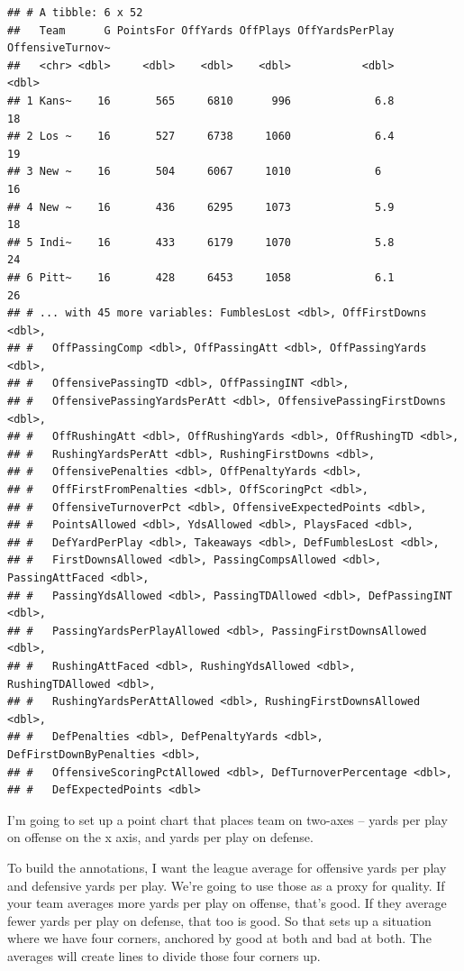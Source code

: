 \documentclass[]{book}
\begin{document}
\begin{verbatim}
## # A tibble: 6 x 52
##   Team      G PointsFor OffYards OffPlays OffYardsPerPlay OffensiveTurnov~
##   <chr> <dbl>     <dbl>    <dbl>    <dbl>           <dbl>            <dbl>
## 1 Kans~    16       565     6810      996             6.8               18
## 2 Los ~    16       527     6738     1060             6.4               19
## 3 New ~    16       504     6067     1010             6                 16
## 4 New ~    16       436     6295     1073             5.9               18
## 5 Indi~    16       433     6179     1070             5.8               24
## 6 Pitt~    16       428     6453     1058             6.1               26
## # ... with 45 more variables: FumblesLost <dbl>, OffFirstDowns <dbl>,
## #   OffPassingComp <dbl>, OffPassingAtt <dbl>, OffPassingYards <dbl>,
## #   OffensivePassingTD <dbl>, OffPassingINT <dbl>,
## #   OffensivePassingYardsPerAtt <dbl>, OffensivePassingFirstDowns <dbl>,
## #   OffRushingAtt <dbl>, OffRushingYards <dbl>, OffRushingTD <dbl>,
## #   RushingYardsPerAtt <dbl>, RushingFirstDowns <dbl>,
## #   OffensivePenalties <dbl>, OffPenaltyYards <dbl>,
## #   OffFirstFromPenalties <dbl>, OffScoringPct <dbl>,
## #   OffensiveTurnoverPct <dbl>, OffensiveExpectedPoints <dbl>,
## #   PointsAllowed <dbl>, YdsAllowed <dbl>, PlaysFaced <dbl>,
## #   DefYardPerPlay <dbl>, Takeaways <dbl>, DefFumblesLost <dbl>,
## #   FirstDownsAllowed <dbl>, PassingCompsAllowed <dbl>, PassingAttFaced <dbl>,
## #   PassingYdsAllowed <dbl>, PassingTDAllowed <dbl>, DefPassingINT <dbl>,
## #   PassingYardsPerPlayAllowed <dbl>, PassingFirstDownsAllowed <dbl>,
## #   RushingAttFaced <dbl>, RushingYdsAllowed <dbl>, RushingTDAllowed <dbl>,
## #   RushingYardsPerAttAllowed <dbl>, RushingFirstDownsAllowed <dbl>,
## #   DefPenalties <dbl>, DefPenaltyYards <dbl>, DefFirstDownByPenalties <dbl>,
## #   OffensiveScoringPctAllowed <dbl>, DefTurnoverPercentage <dbl>,
## #   DefExpectedPoints <dbl>
\end{verbatim}

I'm going to set up a point chart that places team on two-axes -- yards per play on offense on the x axis, and yards per play on defense.

To build the annotations, I want the league average for offensive yards per play and defensive yards per play. We're going to use those as a proxy for quality. If your team averages more yards per play on offense, that's good. If they average fewer yards per play on defense, that too is good. So that sets up a situation where we have four corners, anchored by good at both and bad at both. The averages will create lines to divide those four corners up.
\end{document}
